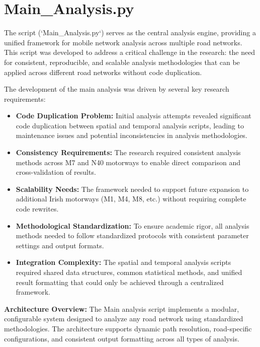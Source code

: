 \documentclass[MScCS]{uccthesis}
\begin{document}
 \section{Main\_Analysis.py}

The script (`Main\_Analysis.py`) serves as the central analysis engine, providing a unified framework for mobile network analysis across multiple road networks. This script was developed to address a critical challenge in the research: the need for consistent, reproducible, and scalable analysis methodologies that can be applied across different road networks without code duplication.

\text
The development of the main analysis was driven by several key research requirements:

\begin{itemize}
\item \textbf{Code Duplication Problem:} Initial analysis attempts revealed significant code duplication between spatial and temporal analysis scripts, leading to maintenance issues and potential inconsistencies in analysis methodologies.

\item \textbf{Consistency Requirements:} The research required consistent analysis methods across M7 and N40 motorways to enable direct comparison and cross-validation of results.

\item \textbf{Scalability Needs:} The framework needed to support future expansion to additional Irish motorways (M1, M4, M8, etc.) without requiring complete code rewrites.

\item \textbf{Methodological Standardization:} To ensure academic rigor, all analysis methods needed to follow standardized protocols with consistent parameter settings and output formats.

\item \textbf{Integration Complexity:} The spatial and temporal analysis scripts required shared data structures, common statistical methods, and unified result formatting that could only be achieved through a centralized framework.
\end{itemize}

\textbf{Architecture Overview:}
The Main analysis script implements a modular, configurable system designed to analyze any road network using standardized methodologies. The architecture supports dynamic path resolution, road-specific configurations, and consistent output formatting across all types of analysis.
\end{document}
